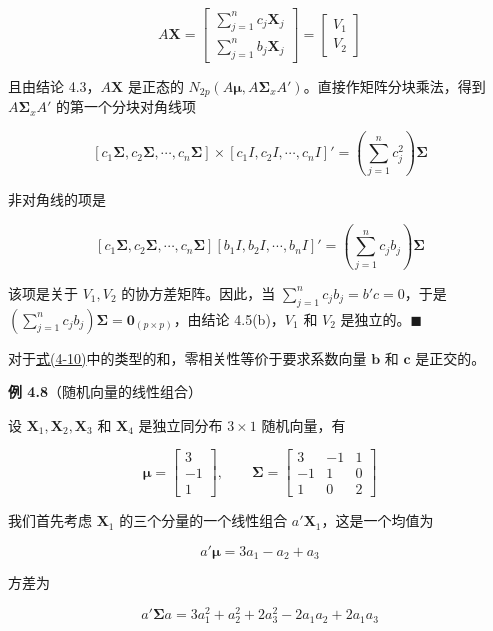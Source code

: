 \[
A\mathbf{X}=\begin{bmatrix}\sum\limits_{j=1}^{n}c_j\mathbf{X}_j\\[6pt]\sum\limits_{j=1}^{n}b_j\mathbf{X}_j\end{bmatrix}=\begin{bmatrix}V_1\\V_2\end{bmatrix}
\]

且由结论 4.3，$A\mathbf{X}$ 是正态的 $N_{2p}\left(A\boldsymbol{\mu},A\boldsymbol{\Sigma}_xA'\right)$。直接作矩阵分块乘法，得到 $A\boldsymbol{\Sigma}_xA'$ 的第一个分块对角线项

\[
[c_1\boldsymbol{\Sigma},c_2\boldsymbol{\Sigma},\cdots,c_n\boldsymbol{\Sigma}]\times[c_1I,c_2I,\cdots,c_nI]'=\left(\sum_{j=1}^{n}c_j^2\right)\boldsymbol{\Sigma}
\]

非对角线的项是

\[
[c_1\boldsymbol{\Sigma},c_2\boldsymbol{\Sigma},\cdots,c_n\boldsymbol{\Sigma}][b_1I,b_2I,\cdots,b_nI]'=\left(\sum_{j=1}^{n}c_jb_j\right)\boldsymbol{\Sigma}
\]

该项是关于 $V_1,V_2$ 的协方差矩阵。因此，当 $\sum\limits_{j=1}^{n}c_jb_j=b'c=0$，于是 $\left(\sum\limits_{j=1}^{n}c_jb_j\right)\boldsymbol{\Sigma}=\mathbf{0}_{(p\times p)}$，由结论 4.5(b)，$V_1$ 和 $V_2$ 是独立的。\hfill$\blacksquare$

对于\hyperref[eq:4-10]{式(4-10)}中的类型的和，零相关性等价于要求系数向量 $\boldsymbol{b}$ 和 $\boldsymbol{c}$ 是正交的。

\noindent\textbf{例 4.8}\quad （随机向量的线性组合）

设 $\mathbf{X}_1,\mathbf{X}_2,\mathbf{X}_3$ 和 $\mathbf{X}_4$ 是独立同分布 $3\times1$ 随机向量，有

\[
\boldsymbol{\mu}=\begin{bmatrix}3\\-1\\1\end{bmatrix},\qquad
\boldsymbol{\Sigma}=\begin{bmatrix}3&-1&1\\-1&1&0\\1&0&2\end{bmatrix}
\]

我们首先考虑 $\mathbf{X}_1$ 的三个分量的一个线性组合 $a'\mathbf{X}_1$，这是一个均值为

\[
a'\boldsymbol{\mu}=3a_1-a_2+a_3
\]

方差为

\[
a'\boldsymbol{\Sigma}a=3a_1^2+a_2^2+2a_3^2-2a_1a_2+2a_1a_3
\]

